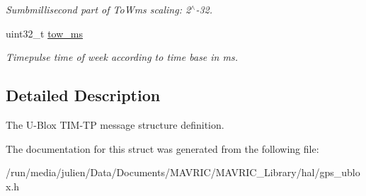\begin{DoxyCompactItemize}
\begin{DoxyCompactList}\small\item\em Sumbmillisecond part of To\+Wms scaling\+: 2$^\wedge$-\/32. \end{DoxyCompactList}\item 
\hypertarget{structubx__tim__tp__t_a4118036b7309ed3c9243e45944520bca}{uint32\+\_\+t \hyperlink{structubx__tim__tp__t_a4118036b7309ed3c9243e45944520bca}{tow\+\_\+ms}}\label{structubx__tim__tp__t_a4118036b7309ed3c9243e45944520bca}

\begin{DoxyCompactList}\small\item\em Timepulse time of week according to time base in ms. \end{DoxyCompactList}\end{DoxyCompactItemize}


\subsection{Detailed Description}
The U-\/\+Blox T\+I\+M-\/\+T\+P message structure definition. 

The documentation for this struct was generated from the following file\+:\begin{DoxyCompactItemize}
\item 
/run/media/julien/\+Data/\+Documents/\+M\+A\+V\+R\+I\+C/\+M\+A\+V\+R\+I\+C\+\_\+\+Library/hal/gps\+\_\+ublox.\+h\end{DoxyCompactItemize}
